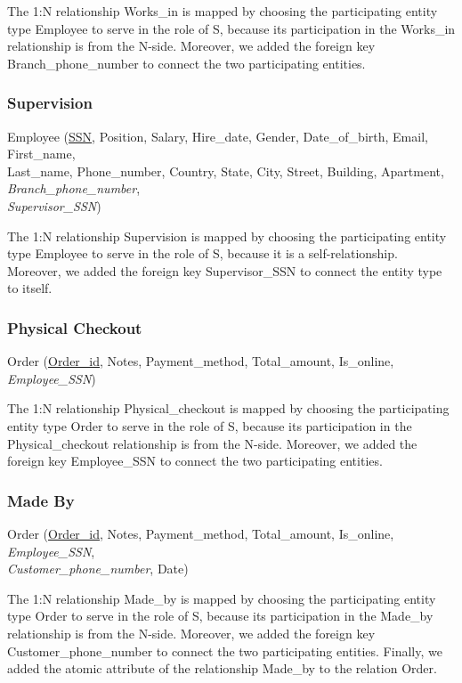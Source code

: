 \documentclass[11pt]{article}
\begin{document}
The 1:N relationship Works\_in is mapped by choosing the participating entity type Employee to serve in the role of S, because its participation in the Works\_in relationship is from the N-side. Moreover, we added the foreign key Branch\_phone\_number to connect the two participating entities.

\subsubsection{Supervision}

Employee (\underline{SSN}, Position, Salary, Hire\_date, Gender, Date\_of\_birth, Email, First\_name, \\
Last\_name, Phone\_number, Country, State, City, Street, Building, Apartment, \textit{Branch\_phone\_number}, \\
\textit{Supervisor\_SSN})

The 1:N relationship Supervision is mapped by choosing the participating entity type Employee to serve in the role of S, because it is a self-relationship. Moreover, we added the foreign key Supervisor\_SSN to connect the entity type to itself.

\subsubsection{Physical Checkout}

Order (\underline{Order\_id}, Notes, Payment\_method, Total\_amount, Is\_online, \textit{Employee\_SSN})

The 1:N relationship Physical\_checkout is mapped by choosing the participating entity type Order to serve in the role of S, because its participation in the Physical\_checkout relationship is from the N-side. Moreover, we added the foreign key Employee\_SSN to connect the two participating entities.

\subsubsection{Made By}

Order (\underline{Order\_id}, Notes, Payment\_method, Total\_amount, Is\_online, \textit{Employee\_SSN}, \\
\textit{Customer\_phone\_number}, Date)

The 1:N relationship Made\_by is mapped by choosing the participating entity type Order to serve in the role of S, because its participation in the Made\_by relationship is from the N-side. Moreover, we added the foreign key Customer\_phone\_number to connect the two participating entities. Finally, we added the atomic attribute of the relationship Made\_by to the relation Order.
\end{document}

